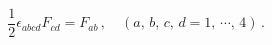 \begin{equation}
  \frac{1}{2}\epsilon_{abcd}F_{cd}=F_{ab}\,,
 \quad (a,\,b,\,c,\,d =1,\,\cdots ,\,4)\,. \label{eq:2.2}
\end{equation}

